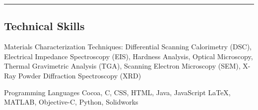 \documentclass[10pt,letterpaper]{article}
\newenvironment{indentsection}[1]%
{\begin{list}{}%
  {\setlength{\leftmargin}{#1}}%
  \item[]%
}
{\end{list}}
\newcommand{\CPP}
{C\nolinebreak[4]\hspace{-.05em}\raisebox{.22ex}{\footnotesize\bf ++}}
\begin{document}
\hrule
\vspace{-0.6em}
\subsection*{Technical Skills}

\begin{indentsection}{\parindent}
\begin{description*}
  \item[Materials Characterization Techniques:]
  Differential Scanning Calorimetry (DSC), Electrical Impedance Spectroscopy (EIS), Hardness Analysis, Optical Microscopy, Thermal Gravimetric Analysis (TGA), Scanning Electron Microscopy (SEM), X-Ray Powder Diffraction Spectroscopy (XRD)
  \item[Programming Languages]
  Cocoa, \CPP, CSS, HTML, Java, JavaScript \LaTeX, MATLAB, Objective-C, Python, Solidworks

\end{description*}
\end{indentsection}
\end{document}
